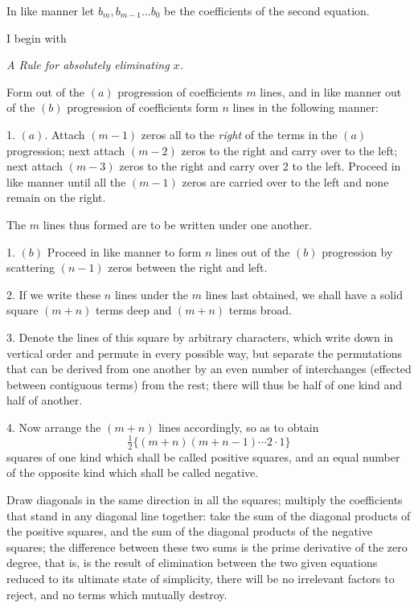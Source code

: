 \documentclass[11pt]{article}
\newcommand{\sourcepage}[1]{\marginpar{\scriptsize p.~#1}}
\begin{document}
In like manner let $b_m,b_{m-1}\ldots b_0$ be the coefficients of the second equation.

I begin with

\begin{center}\itshape A Rule for absolutely eliminating $x$.\end{center}

Form out of the $(a)$ progression of coefficients $m$ lines, and in like manner out of the $(b)$ progression of coefficients form $n$ lines in the following manner:

1. $(a)$. Attach $(m-1)$ zeros all to the \emph{right} of the terms in the $(a)$ progression; next attach $(m-2)$ zeros to the right and carry over to the left; next attach $(m-3)$ zeros to the right and carry over 2 to the left. Proceed in like manner until all the $(m-1)$ zeros are carried over to the left and none remain on the right.

The $m$ lines thus formed are to be written under one another.

1. $(b)$ Proceed in like manner to form $n$ lines out of the $(b)$ progression by scattering $(n-1)$ zeros between the right and left.

2. If we write these $n$ lines under the $m$ lines last obtained, we shall have a solid square $(m+n)$ terms deep and $(m+n)$ terms broad.

3. Denote the lines of this square by arbitrary characters, which write down in vertical order and permute in every possible way, but separate the permutations that can be derived from one another by an even number of interchanges (effected between contiguous terms) from the rest; there will thus be half of one kind and half of another.

\sourcepage{55}
4. Now arrange the $(m+n)$ lines accordingly, so as to obtain
\[
 \tfrac12\{(m+n)(m+n-1)\cdots 2\cdot1\}
\]
squares of one kind which shall be called positive squares, and an equal number of the opposite kind which shall be called negative.

Draw diagonals in the same direction in all the squares; multiply the coefficients that stand in any diagonal line together: take the sum of the diagonal products of the positive squares, and the sum of the diagonal products of the negative squares; the difference between these two sums is the prime derivative of the zero degree, that is, is the result of elimination between the two given equations reduced to its ultimate state of simplicity, there will be no irrelevant factors to reject, and no terms which mutually destroy.
\end{document}
